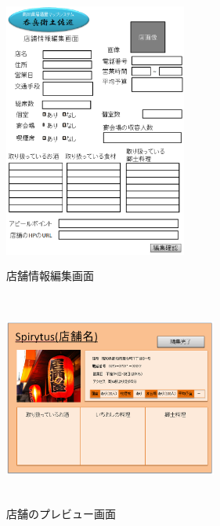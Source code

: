 \documentclass[a4j,titlepage]{jarticle}
\begin{document}
\begin{figure}[htbp]
  \begin{center}
  \includegraphics [height=9cm, width=6cm]{extrnal1_design_document_image/s6.eps}
  \caption{店舗情報編集画面}
  \label {fig:s6}
  \end{center}
\end{figure}

\begin{figure}[htbp]
  \begin{center}
  \includegraphics [height=7cm, width=7cm]{extrnal1_design_document_image/s7.eps}
  \caption{店舗のプレビュー画面}
  \label {fig:s7}
  \end{center}
\end{figure}

\newpage
\end{document}
